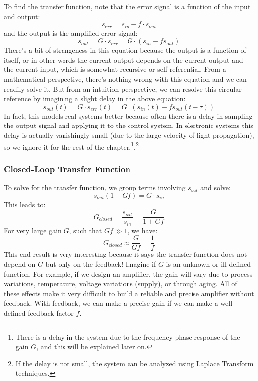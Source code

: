 To find the transfer function, note that the error signal is a function of the input and output:
\begin{equation}
	{s_{err}} = {s_{in}} - f \cdot {s_{out}}
\end{equation}
and the output is the amplified error signal:
\begin{equation}
	{s_{out}} = G \cdot {s_{err}} = G \cdot ({s_{in}} - f{s_{out}})
\end{equation}
There's a bit of strangeness in this equation because the output is a function of itself, or in other words the current output depends on the current output and the current input, which is somewhat recursive or self-referential.  From a mathematical perspective, there's nothing wrong with this equation and we can readily solve it.  But from an intuition perspective, we can resolve this circular reference by imagining a slight delay in the above equation:
\begin{equation}
	{s_{out}(t)} = G \cdot {s_{err}(t) } = G \cdot ({s_{in}(t)} - f{s_{out}(t-\tau)})
\end{equation}
In fact, this models real systems better because often there is a delay in sampling the output signal and applying it to the control system.  In electronic systems this delay is actually vanishingly small (due to the large velocity of light propagation), so we ignore it for the rest of the chapter.\footnote{There is a delay in the system due to the frequency phase response of the gain $G$, and this will be explained later on.},\footnote{If the delay is not small, the system can be analyzed using Laplace Transform techniques.}  
\subsubsection{Closed-Loop Transfer Function}
To solve for the transfer function, we group terms involving $s_{out}$ and solve:
\begin{equation}
	{s_{out}}(1 + Gf) = G \cdot {s_{in}}
\end{equation}
This leads to:
\begin{equation}
	{G_{closed}} = \frac{{{s_{out}}}}{{{s_{in}}}} = \frac{G}{{1 + Gf}}
\end{equation}
For very large gain $G$, such that $Gf \gg 1$, we have:
\begin{equation}
	{G_{closed}} \approx \frac{G}{{Gf}} = \frac{1}{f}
	\label{eq:largegain}
\end{equation}
This end result is very interesting because it says the transfer function does not depend on $G$ but only on the feedback!  Imagine if $G$ is an unknown or ill-defined function.  For example, if we design an amplifier, the gain will vary due to process variations, temperature, voltage variations (supply), or through aging.  All of these effects make it very difficult to build a reliable and precise amplifier without feedback.  With feedback, we can make a precise gain if we can make a well defined feedback factor $f$.
